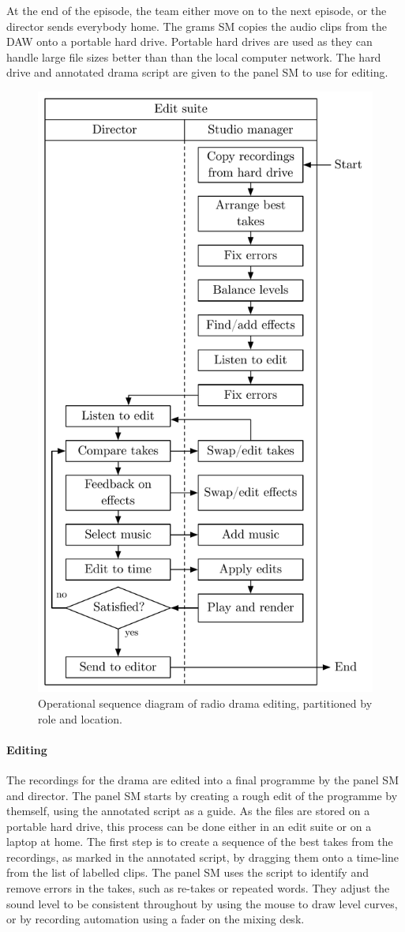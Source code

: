 At the end of the episode, the team either move on to the next episode, or the director sends everybody home.  The
grams SM copies the audio clips from the DAW onto a portable hard drive.  Portable hard drives are used as they can
handle large file sizes better than than the local computer network.  The hard drive and annotated drama
script are given to the panel SM to use for editing.

\begin{figure}
  \centering
  \includegraphics[width=.6\columnwidth]{figs/drama-editing-workflow.pdf}
  \caption{Operational sequence diagram of radio drama editing, partitioned by role and location.}
  \label{fig:ethno-drama-editing}
\end{figure}

\paragraph{Editing}
The recordings for the drama are edited into a final programme by the panel SM and director. The panel SM starts by
creating a rough edit of the programme by themself, using the annotated script as a guide.  As the files are stored
on a portable hard drive, this process can be done either in an edit suite or on a laptop at home. The first step is to
create a sequence of the best takes from the recordings, as marked in the annotated script, by dragging them onto a
time-line from the list of labelled clips.  The panel SM uses the script to identify and remove errors in the takes,
such as re-takes or repeated words.  They adjust the sound level to be consistent throughout by using the mouse
to draw level curves, or by recording automation using a fader on the mixing desk.

